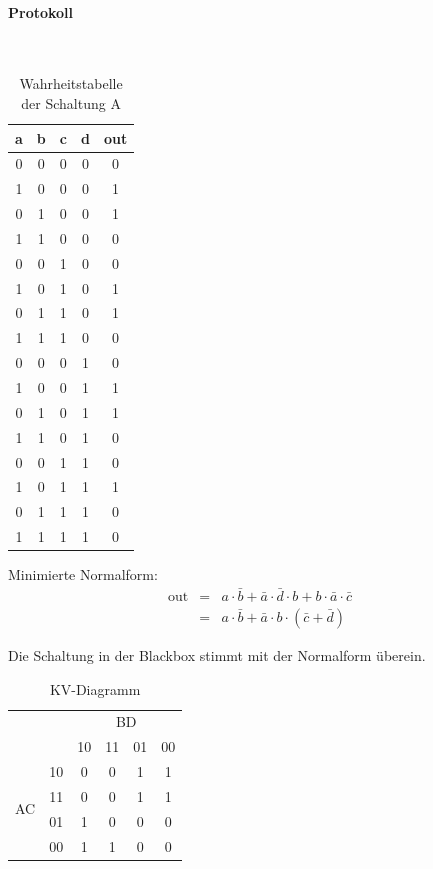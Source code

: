 \documentclass[10pt]{scrreprt}
\begin{document}
    \paragraph{Protokoll}
    $ $
    \begin{table}[H]
        \centering
        \begin{tabular}{cccc|c}
            \toprule
            a & b & c & d & out \\
            \midrule
            0 & 0 & 0 & 0 & 0\\
            1 & 0 & 0 & 0 & 1\\
            0 & 1 & 0 & 0 & 1\\
            1 & 1 & 0 & 0 & 0\\
            0 & 0 & 1 & 0 & 0\\
            1 & 0 & 1 & 0 & 1\\
            0 & 1 & 1 & 0 & 1\\
            1 & 1 & 1 & 0 & 0\\
            0 & 0 & 0 & 1 & 0\\
            1 & 0 & 0 & 1 & 1\\
            0 & 1 & 0 & 1 & 1\\
            1 & 1 & 0 & 1 & 0\\
            0 & 0 & 1 & 1 & 0\\
            1 & 0 & 1 & 1 & 1\\
            0 & 1 & 1 & 1 & 0\\
            1 & 1 & 1 & 1 & 0\\
            \bottomrule
        \end{tabular}
        \caption{Wahrheitstabelle der Schaltung A}
    \end{table}

    Minimierte Normalform:
    \begin{eqnarray*}
        \text{out} &=& a\cdot \bar{b} + \bar{a} \cdot \bar{d} \cdot b + b \cdot \bar{a} \cdot \bar{c}\\
            &=& a \cdot \bar{b} + \bar{a} \cdot b \cdot (\bar{c} + \bar{d})
    \end{eqnarray*}

    Die Schaltung in der Blackbox stimmt mit der Normalform überein.

    \begin{table}
        \centering
        \begin{tabular}{cc|cccc}
            & &  & \multicolumn{2}{c}{BD}\\
            & & 10 & 11 & 01 & 00\\
            \midrule
             & 10 & 0 & 0 & 1 & 1\\
            \multirow{ 2}{*}{AC} & 11 & 0 & 0 & 1 & 1\\
             & 01 & 1 & 0 & 0 & 0\\
             & 00 & 1 & 1 & 0 & 0
        \end{tabular}
        \caption{KV-Diagramm}
    \end{table}
\end{document}
